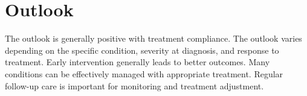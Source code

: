 \section{Outlook}
The outlook is generally positive with treatment compliance. The outlook varies depending on the specific condition, severity at diagnosis, and response to treatment. Early intervention generally leads to better outcomes. Many conditions can be effectively managed with appropriate treatment. Regular follow-up care is important for monitoring and treatment adjustment.
